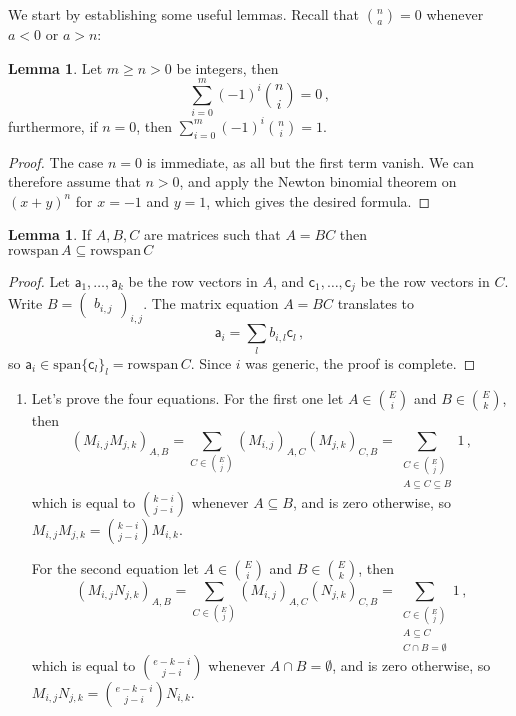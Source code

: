 \documentclass[kulak]{tplt}
\theoremstyle{definition}
\newtheorem{lm}[thm]{Lemma}
\newcommand{\va}{\mathsf{a}}
\newcommand{\vc}{\mathsf{c}}
\newcommand{\spn}{\mathrm{span}}
\newcommand{\rowspn}{\mathrm{rowspan}}
\begin{document}
\begin{enumerate}
We start by establishing some useful lemmas. Recall that $\binom{n}{a} = 0$ whenever $ a < 0 $ or $a > n$:
\begin{lm}\label{lm:binsum}
Let $m \geq n> 0$ be integers, then
$$ \sum_{i=0}^m (-1)^i\binom{n}{i} = 0 \, ,$$
furthermore, if $n=0$, then $\sum_{i=0}^m (-1)^i\binom{n}{i} = 1$.
\end{lm}

\begin{proof}
The case $n=0$ is immediate, as all but the first term vanish.
We can therefore assume that $n>0$, and apply the Newton binomial theorem on $(x+y)^n$ for $x = -1$ and $y = 1$, which gives the desired formula. 
\end{proof}


\begin{lm}\label{lm:rowspan}
If $A, B, C$ are matrices such that $A = BC$ then $\rowspn \, A \subseteq \rowspn \, C$
\end{lm}

\begin{proof}
Let $\va_1, \ldots , \va_k$ be the row vectors in $A$, and $\vc_1, \ldots, \vc_j$ be the row vectors in $C$.
Write $B = \begin{pmatrix}
b_{i, j}
\end{pmatrix}_{i, j}$.
The matrix equation $A = BC$ translates to
$$ \va_i = \sum_l b_{i, l} \vc_l \, ,$$
so $\va_i \in \spn \{\vc_l\}_l = \rowspn \, C$.
Since $i$ was generic, the proof is complete.
\end{proof}

\begin{enumerate}
\item 
Let's prove the four equations.
For the first one let $A \in \binom{E}{i}$ and $B \in \binom{E}{k}$, then
$$(M_{i, j} M_{j, k})_{A, B} = \sum_{C \in \binom{E}{j}} (M_{i, j})_{A, C}( M_{j, k})_{C, B} = \sum_{\substack{C \in \binom{E}{j} \\ A \subseteq C \subseteq B }} 1\, ,$$
which is equal to $\binom{k-i}{j-i}$ whenever $A\subseteq B$, and is zero otherwise, so
$M_{i, j} M_{j, k} = \binom{k-i}{j-i}M_{i, k}$.

For the second equation let $A \in \binom{E}{i}$ and $B \in \binom{E}{k}$, then
$$(M_{i, j} N_{j, k})_{A, B} = \sum_{C \in \binom{E}{j}} (M_{i, j})_{A, C}( N_{j, k})_{C, B} = \sum_{\substack{C \in \binom{E}{j} \\ A \subseteq C \\ C \cap B = \emptyset }} 1 \, ,
$$
which is equal to $\binom{e-k-i}{j-i}$ whenever $A\cap B = \emptyset $, and is zero otherwise, so
$M_{i, j} N_{j, k} = \binom{e-k-i}{j-i}N_{i, k}$.


\end{enumerate}
\end{enumerate}
\end{document}
